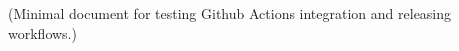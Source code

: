 \documentclass{article}
\begin{document}
(Minimal document for testing Github Actions integration and releasing workflows.)
\end{document}
